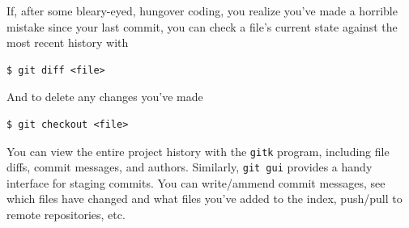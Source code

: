 If, after some bleary-eyed, hungover coding, you realize you've made a horrible mistake since your last commit, you can check a file's current state against the most recent history with
\begin{verbatim}
$ git diff <file>
\end{verbatim}
And to delete any changes you've made
\begin{verbatim}
$ git checkout <file>
\end{verbatim}
You can view the entire project history with the \texttt{gitk} program, including file diffs, commit messages, and authors. Similarly, \texttt{git gui} provides a handy interface for staging commits. You can write/ammend commit messages, see which files have changed and what files you've added to the index, push/pull to remote repositories, etc.

